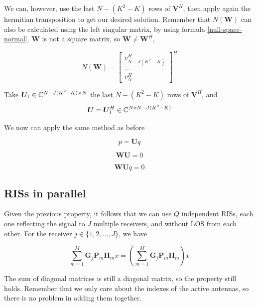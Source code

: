 We can, however, use the last $N - (K^2 - K)$ rows of $\bm{V}^H$, then apply again the hermitian transposition to get our desired solution. Remember that $N(\bm{W})$ can also be calculated using the left singular matrix, by using formula \eqref{null-space-normal}. $\bm{W}$ is not a square matrix, so $\bm{W} \ne \bm{W}^H$,

\begin{equation}
  N(\bm{W}) = \begin{bmatrix} v^H_{N - J(K^2 - K)} \\ ... \\ v^H_N \end{bmatrix} ^ H
\end{equation}

Take $\bm{U}_1 \in \mathbb{C} ^ {N - J(K^2 - K) \times N}$ the last $N - (K^2 - K)$ rows of $\bm{V}^H$, and
\begin{equation}
  \bm{U} = \bm{U}_1^H \in \mathbb{C} ^ {N x N - J(K^2 - K)}
\end{equation}

We now can apply the same method as before

\begin{equation}p = \bm{U}q\end{equation}

\begin{equation}\bm{WU} = 0\end{equation}

\begin{equation}\bm{WU}q = 0\end{equation}

\subsection{RISs in parallel}

Given the previous property, it follows that we can use $Q$ independent RISs, each one reflecting the signal to $J$ multiple receivers, and without LOS from each other. For the receiver $j \in \{1, 2, \ldots , J\}$, we have

\begin{equation}
  \sum_{m=1}^M \bm{G}_j \bm{P}_m \bm{H}_m x = (\sum_{m=1}^M \bm{G}_j \bm{P}_m \bm{H}_m) x
\end{equation}

The sum of diagonal matrices is still a diagonal matrix, so the property still holds. Remember that we only care about the indexes of the active antennas, so there is no problem in adding them together.

